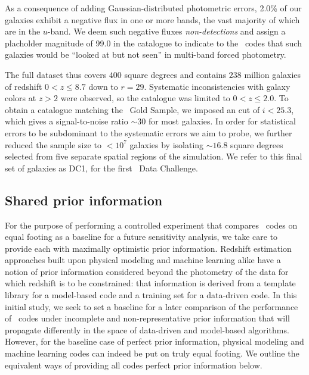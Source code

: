 As a consequence of adding Gaussian-distributed photometric errors, 2.0\% of our galaxies exhibit a negative flux in one or more bands, the vast majority of which are in the $u$-band.
We deem such negative fluxes \textit{non-detections} and assign a placholder magnitude of 99.0 in the catalogue to indicate to the \pzpdf\ codes that such galaxies would be ``looked at but not seen'' in multi-band forced photometry.

The full dataset thus covers $400$ square degrees and contains $238$ million galaxies of redshift $0 < z \leq 8.7$ down to $r = 29$.
Systematic inconsistencies with galaxy colors at $z > 2$ were observed, so the catalogue was limited to $0 < z \leq 2.0$.
To obtain a catalogue matching the \lsst\ Gold Sample, we imposed an cut of $i < 25.3$, which gives a signal-to-noise ratio $\sim 30$ for most galaxies.
In order for statistical errors to be subdominant to the systematic errors we aim to probe, we further reduced the sample size to $<10^{7}$ galaxies by isolating $\sim 16.8$ square degrees selected from five separate spatial regions of the simulation.
We refer to this final set of galaxies as DC1, for the first \lsstdesc\ Data Challenge.

\subsection{Shared prior information}
\label{sec:controlled}

For the purpose of performing a controlled experiment that compares \pzpdf\ codes on equal footing as a baseline for a future sensitivity analysis, we take care to provide each with maximally optimistic prior information.
Redshift estimation approaches built upon physical modeling and machine learning alike have a notion of prior information considered beyond the photometry of the data for which redshift is to be constrained: that information is derived from a template library for a model-based code and a training set for a data-driven code.
In this initial study, we seek to set a baseline for a later comparison of the performance of \pzpdf\ codes under incomplete and non-representative prior information that will propagate differently in the space of data-driven and model-based algorithms.
However, for the baseline case of perfect prior information, physical modeling and machine learning codes can indeed be put on truly equal footing.
We outline the equivalent ways of providing all codes perfect prior information below.

